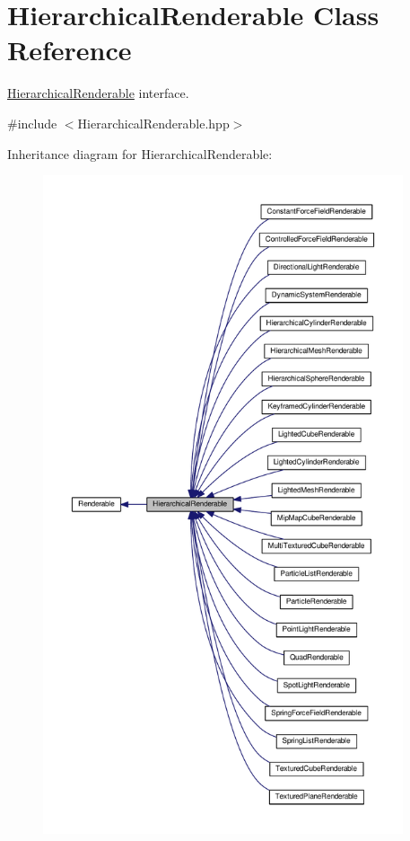 \hypertarget{classHierarchicalRenderable}{\section{Hierarchical\+Renderable Class Reference}
\label{classHierarchicalRenderable}
}


\hyperlink{classHierarchicalRenderable}{Hierarchical\+Renderable} interface.  




{\ttfamily \#include $<$Hierarchical\+Renderable.\+hpp$>$}



Inheritance diagram for Hierarchical\+Renderable\+:\nopagebreak
\begin{figure}[H]
\begin{center}
\leavevmode
\includegraphics[height=550pt]{classHierarchicalRenderable__inherit__graph}
\end{center}
\end{figure}


